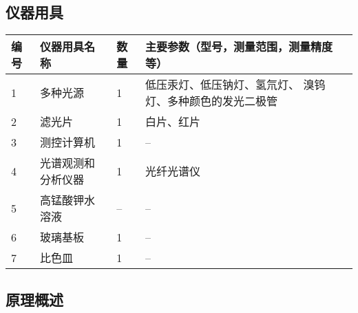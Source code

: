 \documentclass[dvipsnames, svgnames,a4paper,11pt]{article}
\begin{document}
	\subsection{仪器用具}
	\begin{table}[htbp]
		\centering
		\renewcommand\arraystretch{1.6}
		\begin{tabular}{|p{}|p{}|p{}|p{}|}
			\hline
			编号& 仪器用具名称 & 数量 &  主要参数（型号，测量范围，测量精度等） \\
			\hline
			1& 多种光源 & 1 & 低压汞灯、低压钠灯、氢氘灯、 溴钨灯、多种颜色的发光二极管 \\
			\hline
			2& 滤光片 & 1 & 白片、红片 \\
			\hline
			3& 测控计算机 & 1 & -- \\
			\hline
			4& 光谱观测和分析仪器 & 1 & 光纤光谱仪 \\
			\hline
			5& 高锰酸钾水溶液 & -- & -- \\
			\hline
			6& 玻璃基板 & 1 & -- \\
			\hline
			7& 比色皿 & 1 & -- \\
			\hline
		\end{tabular}
	\end{table}
	
	\subsection{原理概述}
	
\end{document}

